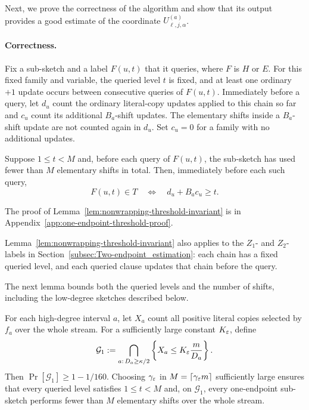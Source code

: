 \medskip
Next, we prove the correctness of the algorithm and show that its output provides a good estimate of the coordinate $U^{(a)}_{\ell,j,\alpha}$.


\paragraph{Correctness.}
Fix a sub-sketch and a label $F(u,t)$ that it queries, where $F$ is $H$ or $E$. For this fixed family and variable, the queried level $t$ is fixed, and at least one ordinary $+1$ update occurs between consecutive queries of $F(u,t)$. Immediately before a query, let $d_u$ count the ordinary literal-copy updates applied to this chain so far and $c_u$ count its additional $B_a$-shift updates. The elementary shifts inside a $B_a$-shift update are not counted again in $d_u$. Set $c_u=0$ for a family with no additional updates.

\begin{samepage}
\begin{lemma}\label{lem:nonwrapping-threshold-invariant}
Suppose $1\le t<M$ and, before each query of $F(u,t)$, the sub-sketch has used fewer than $M$ elementary shifts in total. Then, immediately before each such query,
\[
F(u,t)\in T
\quad\Longleftrightarrow\quad
d_u+B_a c_u\ge t.
\]
\end{lemma}

The proof of Lemma~\ref{lem:nonwrapping-threshold-invariant} is in Appendix~\ref{app:one-endpoint-threshold-proof}.
\end{samepage}

\begin{remark}
Lemma~\ref{lem:nonwrapping-threshold-invariant} also applies to the $Z_1$- and $Z_2$-labels in Section~\ref{subsec:Two-endpoint_estimation}: each chain has a fixed queried level, and each queried clause updates that chain before the query.
\end{remark}

The next lemma bounds both the queried levels and the number of shifts, including the low-degree sketches described below.

\begin{lemma}\label{lem:good_label_budget}
For each high-degree interval $a$, let $X_a$ count all positive literal copies selected by $f_a$ over the whole stream. For a sufficiently large constant $K_\varepsilon$, define
\[
\mathcal G_1:=
\bigcap_{a:\,D_a\ge\kappa/2}
\left\{X_a\le K_\varepsilon\frac{m}{D_a}\right\}.
\]
Then $\Pr[\mathcal G_1]\ge1-1/160$. Choosing $\gamma_\varepsilon$ in $M=\lceil\gamma_\varepsilon m\rceil$ sufficiently large ensures that every queried level satisfies $1\le t<M$ and, on $\mathcal G_1$, every one-endpoint sub-sketch performs fewer than $M$ elementary shifts over the whole stream.
\end{lemma}

